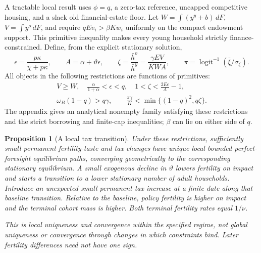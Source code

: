 \documentclass[11pt]{article}
\newtheorem{proposition}{Proposition}
\newcommand{\dd}{\,d}
\newcommand{\tht}{\vartheta}
\newcommand{\logit}{\operatorname{logit}^{-1}}
\begin{document}
A tractable local result uses $\phi=q$, a zero-tax reference, uncapped competitive housing, and a slack old financial-estate floor. Let $W=\int(y^y+b)\dd F$, $V=\int y^o\dd F$, and require $qEv_i>\beta Kw_i$ uniformly on the compact endowment support. This primitive inequality makes every young household strictly finance-constrained. Define, from the explicit stationary solution,
\begin{equation}
 \epsilon=\frac{p\kappa}{\chi+p\kappa},\qquad
 A=\alpha+\tht\epsilon,\qquad
 \zeta=\frac{\bar h^o}{\bar h^y}=\frac{\gamma EV}{KWA},\qquad
 \pi=\logit(\bar\xi/\sigma_\xi).\label{eq:dynamicprimitive}
\end{equation}
All objects in the following restrictions are functions of primitives:
\begin{equation}
 \begin{gathered}
 V\ge W,\quad
 \frac\alpha{1+\alpha}<\epsilon<q,\quad
 1<\zeta<\frac{2E\epsilon}{A}-1,\\
 \omega_B(1-q)>q\gamma,\qquad
 \frac{\pi\gamma}{K}<\min\{(1-q)^2,q\zeta\}.
 \end{gathered}\label{eq:transitionconditions}
\end{equation}
The appendix gives an analytical nonempty family satisfying these restrictions and the strict borrowing and finite-cap inequalities; $\beta$ can lie on either side of $q$.

\begin{proposition}[A local tax transition]\label{prop:transition}
Under these restrictions, sufficiently small permanent fertility-taste and tax changes have unique local bounded perfect-foresight equilibrium paths, converging geometrically to the corresponding stationary equilibrium. A small exogenous decline in $\tht$ lowers fertility on impact and starts a transition to a lower stationary number of adult households. Introduce an unexpected small permanent tax increase at a finite date along that baseline transition. Relative to the baseline, policy fertility is higher on impact and the terminal cohort mass is higher. Both terminal fertility rates equal $1/\nu$.

This is local uniqueness and convergence within the specified regime, not global uniqueness or convergence through changes in which constraints bind. Later fertility differences need not have one sign.
\end{proposition}
\end{document}
